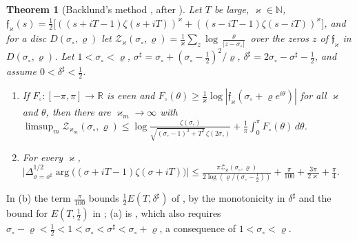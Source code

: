 \documentclass[preprint,12pt]{elsarticle}
\numberwithin{equation}{section}
\theoremstyle{plain}
\newtheorem{theorem}{Theorem}[section]
\theoremstyle{definition}
\theoremstyle{remark}
\newcommand{\R}{\mathbb R}
\begin{document}
\begin{theorem}[Backlund's method {\cite[Lemmas~2.1, 2.3 and 2.4]{BellottiWong2025}}, after {\cite{Trudgian2014,HasanalizadeShenWong2022}}]\label{thm:known_backlund}
Let $T$ be large, $\varkappa\in\mathbb N$, $\mathfrak f_\varkappa(s)=\frac12\bigl[((s+iT-1)\zeta(s+iT))^\varkappa+((s-iT-1)\zeta(s-iT))^\varkappa\bigr]$, and for a disc $D(\sigma_\circ,\varrho)$ let $\mathcal Z_\varkappa(\sigma_\circ,\varrho)=\frac1\varkappa\sum_z\log\frac{\varrho}{|z-\sigma_\circ|}$ over the zeros $z$ of $\mathfrak f_\varkappa$ in $D(\sigma_\circ,\varrho)$. Let $1<\sigma_\circ<\varrho$, $\sigma^\sharp=\sigma_\circ+(\sigma_\circ-\frac12)^2/\varrho$, $\delta^\sharp=2\sigma_\circ-\sigma^\sharp-\frac12$, and assume $0<\delta^\sharp<\frac12$.
\begin{enumerate}[label=(\alph*),leftmargin=2em]
\item If $F_\circ:[-\pi,\pi]\to\R$ is even and $F_\circ(\theta)\ge\frac1\varkappa\log|\mathfrak f_\varkappa(\sigma_\circ+\varrho e^{i\theta})|$ for all $\varkappa$ and $\theta$, then there are $\varkappa_m\to\infty$ with $\limsup_m\mathcal Z_{\varkappa_m}(\sigma_\circ,\varrho)\le\log\frac{\zeta(\sigma_\circ)}{\sqrt{(\sigma_\circ-1)^2+T^2}\,\zeta(2\sigma_\circ)}+\frac1\pi\int_0^\pi F_\circ(\theta)\,d\theta$.
\item For every $\varkappa$, $\bigl|\Delta_{\sigma=\sigma^\sharp}^{1/2}\arg\bigl((\sigma+iT-1)\zeta(\sigma+iT)\bigr)\bigr|\le\frac{\pi\mathcal Z_\varkappa(\sigma_\circ,\varrho)}{2\log(\varrho/(\sigma_\circ-\frac12))}+\frac{\pi}{100}+\frac{3\pi}{2\varkappa}+\frac\pi4$.
\end{enumerate}
\end{theorem}
In (b) the term $\frac\pi{100}$ bounds $\frac12E(T,\delta^\sharp)$ of \cite[Lemma~2.3]{BellottiWong2025}, by the monotonicity in $\delta^\sharp$ and the bound for $E(T,\frac12)$ in \cite[Lemma~2.4]{BellottiWong2025}; (a) is \cite[Lemma~2.1]{BellottiWong2025}, which also requires $\sigma_\circ-\varrho<\frac12<1<\sigma_\circ<\sigma^\sharp<\sigma_\circ+\varrho$, a consequence of $1<\sigma_\circ<\varrho$.
\end{document}
